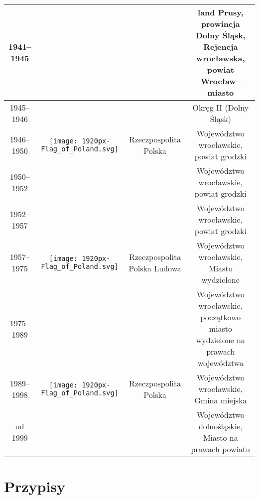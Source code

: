 \documentclass{article}
\begin{document}
{\begin{tabular}{|c|c|c|c|c|}
\cline{1-1}
\cline{5-5}
1941–1945  & & \multicolumn{2}{|c|}{} & land Prusy, prowincja Dolny Śląsk, Rejencja wrocławska, powiat Wrocław–miasto \\ 
\hline
1945–1946 && \multicolumn{2}{|c|}{} & Okręg II (Dolny Śląsk) \\
\cline{1-1}
\cline{5-5}
1946–1950 & \texttt{[image: 1920px-Flag\_of\_Poland.svg]} & \multicolumn{2}{|c|}{Rzeczpospolita Polska} & Województwo wrocławskie, powiat grodzki \\ 
\cline{1-1}
\cline{5-5}
1950–1952 && \multicolumn{2}{|c|}{} & Województwo wrocławskie, powiat grodzki \\
\hline
1952–1957 && \multicolumn{2}{|c|}{} & Województwo wrocławskie, powiat grodzki \\
\cline{1-1}
\cline{5-5}
1957–1975 & \texttt{[image: 1920px-Flag\_of\_Poland.svg]} & \multicolumn{2}{|c|}{Rzeczpospolita Polska Ludowa} & Województwo wrocławskie, Miasto wydzielone \\ 
\cline{1-1}
\cline{5-5}
1975–1989 && \multicolumn{2}{|c|}{} & Województwo wrocławskie, początkowo miasto wydzielone na prawach województwa \\
\hline 
1989–1998  & \texttt{[image: 1920px-Flag\_of\_Poland.svg]} & \multicolumn{2}{|c|}{Rzeczpospolita Polska} & Województwo wrocławskie, Gmina miejska \\ 
\cline{1-1}
\cline{5-5}
od 1999 && \multicolumn{2}{|c|}{} & Województwo dolnośląskie, Miasto na prawach powiatu \\
\hline
\end {tabular}}

\section*{Przypisy}


\vspace{10pt}
\end{document}
